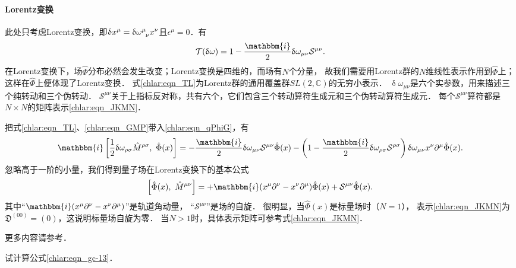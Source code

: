 \paragraph{Lorentz变换}
此处只考虑Lorentz变换，即$\updelta x^\mu= \updelta\omega^\mu_{\hphantom{\mu}\nu}x^\nu$且$\epsilon^\mu=0$．有
\begin{equation}\label{chlar:eqn_TL}
	\mathcal{T}(\updelta\omega)=1-\frac{\mathbbm{i}}{2} \updelta\omega_{\mu\nu} \mathcal{S}^{\mu\nu}.
\end{equation}
在Lorentz变换下，场$\hat{\Phi}$分布必然会发生改变；Lorentz变换是四维的，而场有$N$个分量，
故我们需要用Lorentz群的$N$维线性表示作用到$\hat{\Phi}$上；这样在$\hat{\Phi}$上便体现了Lorentz变换．
式\eqref{chlar:eqn_TL}为Lorentz群的通用覆盖群$SL(2,\mathbb{C})$的无穷小表示．
$\updelta\omega_{\mu\nu}$是六个实参数，用来描述三个纯转动和三个伪转动．
$\mathcal{S}^{\mu\nu}$关于上指标反对称，共有六个，它们包含三个转动算符生成元和三个伪转动算符生成元．
每个$\mathcal{S}^{\mu\nu}$算符都是$N\times N$的矩阵表示\eqref{chlar:eqn_JKMN}．

把式\eqref{chlar:eqn_TL}、\eqref{chlar:eqn_GMP}带入\eqref{chlar:eqn_qPhiG}，有
\begin{align*}
	\mathbbm{i}\left[ \frac{1}{2}\updelta\omega_{\rho\sigma} \hat{M}^{\rho\sigma},\ \hat{\Phi}(x)\right] = 
	-\frac{\mathbbm{i}}{2} \updelta\omega_{\mu\nu} \mathcal{S}^{\mu\nu} \hat{\Phi}(x)
	-\left(1-\frac{\mathbbm{i}}{2} \updelta\omega_{\rho\sigma} \mathcal{S}^{\rho\sigma}\right)  
	\updelta\omega_{\mu\nu}x^\nu  \partial^{\mu}\hat{\Phi}(x) .
\end{align*}
忽略高于一阶的小量，我们得到量子场在Lorentz变换下的基本公式
\begin{equation}\label{chlar:eqn_Phi-Lorentz}
	\left[\hat{\Phi}(x),\ \hat{M}^{\mu\nu}\right] = 
	+\mathbbm{i}(x^\mu  \partial^{\nu}-x^\nu  \partial^{\mu})\hat{\Phi}(x)
	+\mathcal{S}^{\mu\nu} \hat{\Phi}(x) .
\end{equation}
其中“$\mathbbm{i}(x^\mu  \partial^{\nu}-x^\nu  \partial^{\mu})$”是轨道角动量，
“$\mathcal{S}^{\mu\nu}$”是场的自旋．
很明显，当$\hat{\Phi}(x)$是标量场时（$N=1$），
表示\eqref{chlar:eqn_JKMN}为$\mathfrak{D}^{(00)} = (0)$，这说明标量场自旋为零．
当$N>1$时，具体表示矩阵可参考式\eqref{chlar:eqn_JKMN}．

更多内容请参考\parencite[\S 5.6,5.7]{weinberg_vol1}．




\begin{exercise}
	试计算公式\eqref{chlar:eqn_gc-13}．
\end{exercise}

